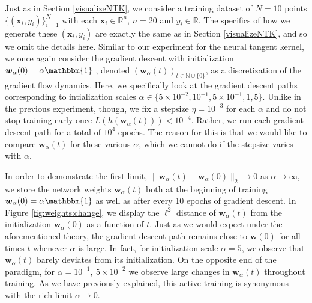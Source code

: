 \documentclass{article}
\begin{document}
Just as in Section \ref{visualizeNTK}, we consider a training dataset of $N = 10$ points $\{(\boldsymbol{x}_i, y_i) \}_{i=1}^N$ with each $\boldsymbol{x}_i \in \mathbb{R}^n$, $n=20$ and $y_i \in \mathbb{R}$. The specifics of how we generate these $(\boldsymbol{x}_i, y_i)$ are exactly the same as in Section \ref{visualizeNTK}, and so we omit the details here. Similar to our experiment for the neural tangent kernel, we once again consider the gradient descent with initialization $\boldsymbol{w}_{\alpha}(0) = \alpha \mathbbm{1}$ , denoted $(\boldsymbol{w}_{\alpha}(t))_{t \in \mathbb{N}\cup\{0\}}$, as a discretization of the gradient flow dynamics. Here, we specifically look at the gradient descent paths corresponding to intialization scales $\alpha \in \{ 5\times10^{-2}, 10^{-1}, 5 \times 10^{-1}, 1, 5\}$. Unlike in the previous experiment, though, we fix a stepsize $\eta = 10^{-3}$ for each $\alpha$ and do not stop training early once $L(h(\boldsymbol{w}_{\alpha}(t))) < 10^{-4}$. Rather, we run each gradient descent path for a total of $10^4$ epochs. The reason for this is that we would like to compare $\boldsymbol{w}_{\alpha}(t)$ for these various $\alpha$, which we cannot do if the stepsize varies with $\alpha$.

In order to demonstrate the first limit, $\| \boldsymbol{w}_{\alpha}(t) -  \boldsymbol{w}_{\alpha}(0) \|_2 \rightarrow 0$ as $\alpha \rightarrow \infty$, we store the network weights $\boldsymbol{w}_{\alpha}(t)$ both at the beginning of training $\boldsymbol{w}_{\alpha}(0) = \alpha \mathbbm{1}$ as well as after every 10 epochs of gradient descent. In Figure \ref{fig:weights:change}, we display the $\ell^2$ distance of $\boldsymbol{w}_{\alpha}(t)$ from the initialization $\boldsymbol{w}_{\alpha}(0)$ as a function of $t$. Just as we would expect under the aforementioned theory, the gradient descent path remains close to $\boldsymbol{w}(0)$ for all times $t$ whenever $\alpha$ is large. In fact, for initialization scale $\alpha = 5$, we observe that $\boldsymbol{w}_{\alpha}(t)$ barely deviates from its initialization. On the opposite end of the paradigm, for $\alpha = 10^{-1}, \ 5 \times 10^{-2}$ we observe large changes in $\boldsymbol{w}_{\alpha}(t)$ throughout training. As we have previously explained, this active training is synonymous with the rich limit $\alpha \rightarrow 0$.
\end{document}
